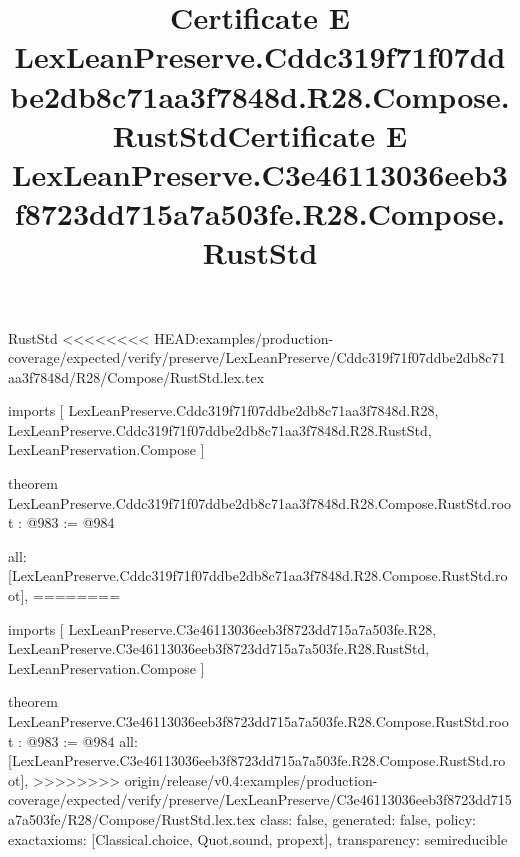 \begin{lexlean}{RustStd}
<<<<<<<< HEAD:examples/production-coverage/expected/verify/preserve/LexLeanPreserve/Cddc319f71f07ddbe2db8c71aa3f7848d/R28/Compose/RustStd.lex.tex
\title{Certificate E LexLeanPreserve.Cddc319f71f07ddbe2db8c71aa3f7848d.R28.Compose.RustStd}
\begin{coremodule}
imports [
  LexLeanPreserve.Cddc319f71f07ddbe2db8c71aa3f7848d.R28,
  LexLeanPreserve.Cddc319f71f07ddbe2db8c71aa3f7848d.R28.RustStd,
  LexLeanPreservation.Compose
]

theorem LexLeanPreserve.Cddc319f71f07ddbe2db8c71aa3f7848d.R28.Compose.RustStd.root : @983 := @984 {
  all: [LexLeanPreserve.Cddc319f71f07ddbe2db8c71aa3f7848d.R28.Compose.RustStd.root],
========
\title{Certificate E LexLeanPreserve.C3e46113036eeb3f8723dd715a7a503fe.R28.Compose.RustStd}
\begin{coremodule}
imports [
  LexLeanPreserve.C3e46113036eeb3f8723dd715a7a503fe.R28,
  LexLeanPreserve.C3e46113036eeb3f8723dd715a7a503fe.R28.RustStd,
  LexLeanPreservation.Compose
]

theorem LexLeanPreserve.C3e46113036eeb3f8723dd715a7a503fe.R28.Compose.RustStd.root : @983 := @984 {
  all: [LexLeanPreserve.C3e46113036eeb3f8723dd715a7a503fe.R28.Compose.RustStd.root],
>>>>>>>> origin/release/v0.4:examples/production-coverage/expected/verify/preserve/LexLeanPreserve/C3e46113036eeb3f8723dd715a7a503fe/R28/Compose/RustStd.lex.tex
  class: false,
  generated: false,
  policy: exact{axioms: [Classical.choice, Quot.sound, propext]},
  transparency: semireducible
}


\end{coremodule}}
\end{coremodule}
\end{lexlean}

